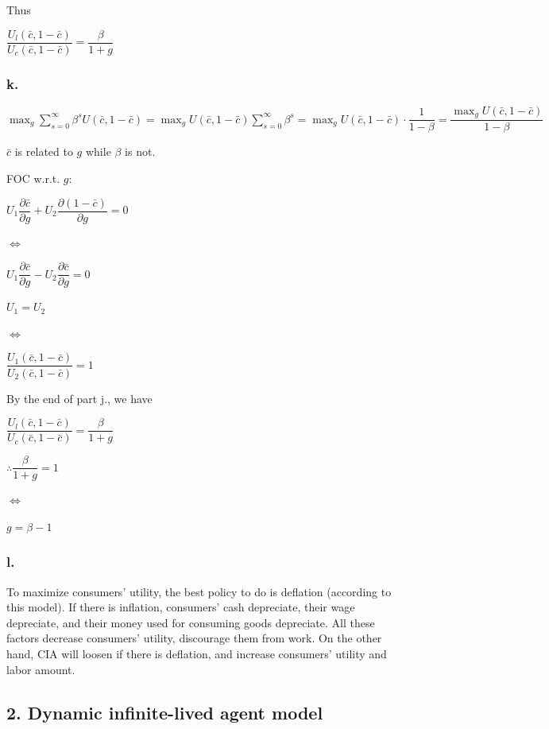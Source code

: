 \documentclass{article}
\begin{document}
Thus

$\boxed{\dfrac{U_{l}\left(\bar{c},1-\bar{c}\right)}{U_{c}\left(\bar{c},1-\bar{c}\right)}=\dfrac{\beta}{1+g}}$

\subsubsection*{\textrm{k.}}

$\displaystyle\max_{g}\sum^{\infty}_{s=0}\beta^{s}U\left(\bar{c},1-\bar{c}\right)=\max_{g}U\left(\bar{c},1-\bar{c}\right)\sum^{\infty}_{s=0}\beta^{s}=\max_{g}U\left(\bar{c},1-\bar{c}\right)\cdot\dfrac{1}{1-\beta}=\dfrac{\displaystyle\max_{g}U\left(\bar{c},1-\bar{c}\right)}{1-\beta}$

$\bar{c}$ is related to $g$ while $\beta$ is not.

FOC w.r.t. $g$:

$U_{1}\dfrac{\partial \bar{c}}{\partial g}+U_{2}\dfrac{\partial \left(1-\bar{c}\right)}{\partial g}=0$

$\iff$

$U_{1}\dfrac{\partial \bar{c}}{\partial g}-U_{2}\dfrac{\partial \bar{c}}{\partial g}=0$

$U_{1}=U_{2}$

$\iff$

$\dfrac{U_{1}\left(\bar{c},1-\bar{c}\right)}{U_{2}\left(\bar{c},1-\bar{c}\right)}=1$

By the end of part \textrm{j.}, we have

$\dfrac{U_{l}\left(\bar{c},1-\bar{c}\right)}{U_{c}\left(\bar{c},1-\bar{c}\right)}=\dfrac{\beta}{1+g}$

$\therefore \dfrac{\beta}{1+g}=1$

$\iff$

$\boxed{g=\beta-1}$

\subsubsection*{\textrm{l.}}

To maximize consumers' utility, the best policy to do is deflation (according to this model). If there is inflation, consumers' cash depreciate, their wage depreciate, and their money used for consuming goods depreciate. All these factors decrease consumers' utility, discourage them from work. On the other hand, CIA will loosen if there is deflation, and increase consumers' utility and labor amount. 

\subsection*{\textrm{2. Dynamic infinite-lived agent model}}
\end{document}
